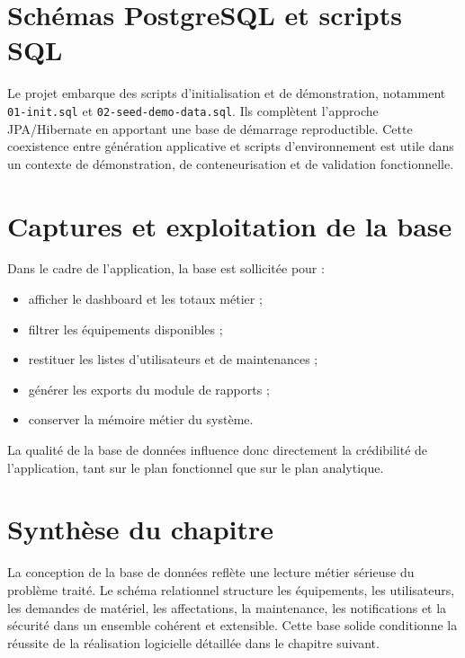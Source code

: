 \section{Schémas PostgreSQL et scripts SQL}
Le projet embarque des scripts d'initialisation et de démonstration, notamment \texttt{01-init.sql} et \texttt{02-seed-demo-data.sql}. Ils complètent l'approche JPA/Hibernate en apportant une base de démarrage reproductible. Cette coexistence entre génération applicative et scripts d'environnement est utile dans un contexte de démonstration, de conteneurisation et de validation fonctionnelle.

\begin{codeblock}[H]
\caption{Script d'initialisation PostgreSQL}

\end{codeblock}

\section{Captures et exploitation de la base}
Dans le cadre de l'application, la base est sollicitée pour :
\begin{itemize}
  \item afficher le dashboard et les totaux métier ;
  \item filtrer les équipements disponibles ;
  \item restituer les listes d'utilisateurs et de maintenances ;
  \item générer les exports du module de rapports ;
  \item conserver la mémoire métier du système.
\end{itemize}

La qualité de la base de données influence donc directement la crédibilité de l'application, tant sur le plan fonctionnel que sur le plan analytique.

\section{Synthèse du chapitre}
La conception de la base de données reflète une lecture métier sérieuse du problème traité. Le schéma relationnel structure les équipements, les utilisateurs, les demandes de matériel, les affectations, la maintenance, les notifications et la sécurité dans un ensemble cohérent et extensible. Cette base solide conditionne la réussite de la réalisation logicielle détaillée dans le chapitre suivant.










